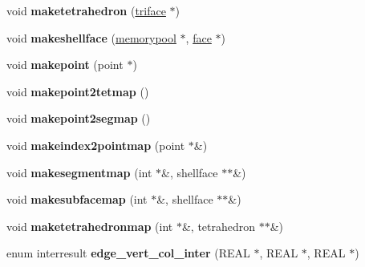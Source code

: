 \begin{DoxyCompactItemize}
\item 
\hypertarget{classtetgenmesh_aa1a1561e6fde22070832ae038976067b}{void {\bfseries maketetrahedron} (\hyperlink{classtetgenmesh_1_1triface}{triface} $\ast$)}\label{classtetgenmesh_aa1a1561e6fde22070832ae038976067b}

\item 
\hypertarget{classtetgenmesh_a98c862e8bb1f1c25e03bb550804028cd}{void {\bfseries makeshellface} (\hyperlink{classtetgenmesh_1_1memorypool}{memorypool} $\ast$, \hyperlink{classtetgenmesh_1_1face}{face} $\ast$)}\label{classtetgenmesh_a98c862e8bb1f1c25e03bb550804028cd}

\item 
\hypertarget{classtetgenmesh_aa0dadca8ccff4114974a7936788a8864}{void {\bfseries makepoint} (point $\ast$)}\label{classtetgenmesh_aa0dadca8ccff4114974a7936788a8864}

\item 
\hypertarget{classtetgenmesh_a3174869fba89e88a4846c0c1be367103}{void {\bfseries makepoint2tetmap} ()}\label{classtetgenmesh_a3174869fba89e88a4846c0c1be367103}

\item 
\hypertarget{classtetgenmesh_a6eac202ee58e0b674c94a00e6314222e}{void {\bfseries makepoint2segmap} ()}\label{classtetgenmesh_a6eac202ee58e0b674c94a00e6314222e}

\item 
\hypertarget{classtetgenmesh_a0a278dbd160df620cfe93fd3eed5e9da}{void {\bfseries makeindex2pointmap} (point $\ast$\&)}\label{classtetgenmesh_a0a278dbd160df620cfe93fd3eed5e9da}

\item 
\hypertarget{classtetgenmesh_adaa51621d3836f7042277f1e76fcbc12}{void {\bfseries makesegmentmap} (int $\ast$\&, shellface $\ast$$\ast$\&)}\label{classtetgenmesh_adaa51621d3836f7042277f1e76fcbc12}

\item 
\hypertarget{classtetgenmesh_ade16f0438efd712239d4d1221c0197f5}{void {\bfseries makesubfacemap} (int $\ast$\&, shellface $\ast$$\ast$\&)}\label{classtetgenmesh_ade16f0438efd712239d4d1221c0197f5}

\item 
\hypertarget{classtetgenmesh_a343c85fb952f9fddd82afdfffa8f6992}{void {\bfseries maketetrahedronmap} (int $\ast$\&, tetrahedron $\ast$$\ast$\&)}\label{classtetgenmesh_a343c85fb952f9fddd82afdfffa8f6992}

\item 
\hypertarget{classtetgenmesh_acdee84c486856f0ad44fc9c2e22bcc2e}{enum interresult {\bfseries edge\-\_\-vert\-\_\-col\-\_\-inter} (R\-E\-A\-L $\ast$, R\-E\-A\-L $\ast$, R\-E\-A\-L $\ast$)}\label{classtetgenmesh_acdee84c486856f0ad44fc9c2e22bcc2e}


\end{DoxyCompactItemize}

